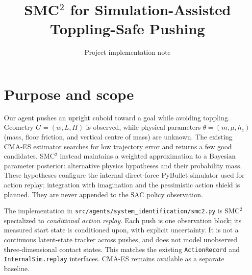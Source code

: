 \documentclass[11pt]{article}
\title{SMC$^2$ for Simulation-Assisted Toppling-Safe Pushing}
\author{Project implementation note}
\date{}
\begin{document}
\maketitle

\section{Purpose and scope}
Our agent pushes an upright cuboid toward a goal while avoiding toppling.
Geometry $G=(w,L,H)$ is observed, while physical parameters
$\theta=(m,\mu,h_c)$ (mass, floor friction, and vertical centre of mass)
are unknown. The existing CMA-ES estimator searches for low trajectory
error and returns a few good candidates. SMC$^2$ instead maintains a
weighted approximation to a Bayesian parameter posterior: alternative
physics hypotheses and their probability mass. These hypotheses configure
the internal direct-force PyBullet simulator used for action replay;
integration with imagination and the pessimistic action shield is planned. They are never appended to the SAC
policy observation.

The implementation in \texttt{src/agents/system\_identification/smc2.py} is SMC$^2$ specialized to
\emph{conditional action replay}. Each push is one observation block;
its measured start state is conditioned upon, with explicit uncertainty.
It is not a continuous latent-state tracker across pushes, and does not
model unobserved three-dimensional contact states. This matches the
existing \texttt{ActionRecord} and \texttt{InternalSim.replay}
interfaces.
CMA-ES remains available as a separate baseline.
\end{document}

